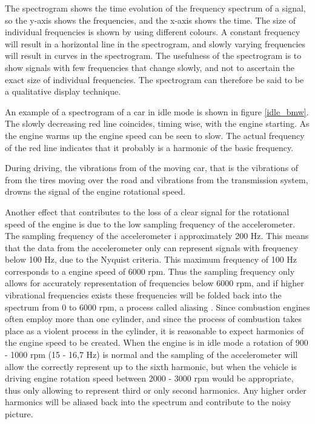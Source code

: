 The spectrogram shows the time evolution of the frequency spectrum of a signal, so the y-axis shows the frequencies, and the x-axis shows the time. The size of individual frequencies is shown by using different colours. A constant frequency will result in a horizontal line in the spectrogram, and slowly varying frequencies will result in curves in the spectrogram. The usefulness of the spectrogram is to show signals with few  frequencies that change slowly, and not to ascertain the exact size of individual frequencies. The spectrogram can therefore be said to be a qualitative display technique.

An example of a spectrogram of a car in idle mode is shown in figure \ref{idle_bmw}. The slowly decreasing red line coincides, timing wise, with the engine starting. As the engine warms up the engine speed can be seen to slow. The actual frequency of the red line indicates that it probably is a harmonic of the basic frequency.
  
During driving, the vibrations from of the moving car, that is the vibrations of from the tires moving over the road and vibrations from the transmission system, drowns the signal of the engine rotational speed.

Another effect that contributes to the loss of a clear signal for the rotational speed of the engine is due to the low sampling frequency of the accelerometer. The sampling frequency of the accelerometer i approximately 200 Hz. This means that the data from the accelerometer only can represent signals with frequency below 100 Hz, due to the Nyquist criteria. This maximum frequency of 100 Hz corresponds to a engine speed of 6000 rpm. Thus the sampling frequency only allows for accurately representation of frequencies below 6000 rpm, and if higher vibrational frequencies exists these frequencies will be folded back into the spectrum from 0 to 6000 rpm, a process called aliasing \cite{lyons2010understanding}. Since combustion engines often employ more than one cylinder, and since the process of combustion takes place as a violent process in the cylinder, it is reasonable to expect harmonics of the engine speed to be created. When the engine is in idle mode a rotation of 900 - 1000 rpm (15 - 16,7 Hz) is normal and the sampling of the accelerometer will allow the correctly represent up to the sixth harmonic, but when the vehicle is driving engine rotation speed between  
2000 - 3000 rpm would be appropriate, thus only allowing to represent third or only second harmonics. Any higher order harmonics will be aliased back into the spectrum and contribute to the noisy picture. 

